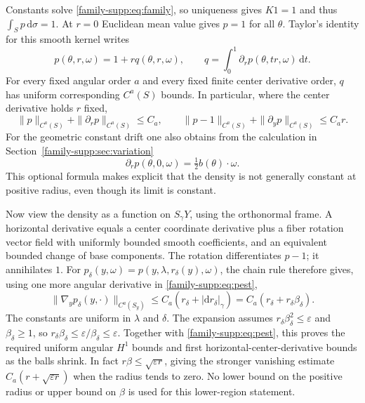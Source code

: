 \documentclass[11pt]{article}
\theoremstyle{definition}
\theoremstyle{remark}
\newcommand{\dd}{\mathrm d}
\numberwithin{equation}{section}
\providecommand{\la}{\lambda}
\providecommand{\tht}{\theta}
\begin{document}
Constants solve \eqref{family-supp:eq:family}, so uniqueness gives $K1=1$ and thus
$\int_Sp\,\dd\sigma=1$. At $r=0$ Euclidean mean value gives $p=1$
for all $\tht$. Taylor's identity for this smooth kernel writes
\begin{equation}\label{family-supp:eq:pdifference}
 p(\tht,r,\omega)=1+r q(\tht,r,\omega),\qquad
 q=\int_0^1\partial_r p(\tht,tr,\omega)\,\dd t.
\end{equation}
For every fixed angular order $a$ and every fixed finite center derivative
order, $q$ has uniform corresponding $C^a(S)$ bounds. In particular,
where the center derivative holds $r$ fixed,
\begin{equation}\label{family-supp:eq:pest}
 \|p\|_{C^a(S)}+\|\partial_rp\|_{C^a(S)}\leq C_a,\qquad
 \|p-1\|_{C^a(S)}+\|\partial_y p\|_{C^a(S)}\leq C_a r.
\end{equation}
For the geometric constant drift one also obtains from the calculation
in Section~\ref{family-supp:sec:variation}
\[
 \partial_rp(\tht,0,\omega)=\tfrac12 b(\tht)\cdot\omega.
\]
This optional formula makes explicit that the density is not generally
constant at positive radius, even though its limit is constant.

Now view the density as a function on $S_\gamma Y$, using the orthonormal
frame. A horizontal derivative equals a center coordinate derivative
plus a fiber rotation vector field with uniformly bounded smooth
coefficients, and an equivalent bounded change of base components.
The rotation differentiates $p-1$; it annihilates $1$. For
$p_\delta(y,\omega)=p(y,\la,r_\delta(y),\omega)$, the chain rule therefore
gives, using one more angular derivative in \eqref{family-supp:eq:pest},
\begin{equation}\label{family-supp:eq:movingp}
 \|\nabla_y p_\delta(y,\cdot)\|_{C^a(S_y)}
      \leq C_a(r_\delta+|\dd r_\delta|_\gamma)
      =C_a(r_\delta+r_\delta\beta_\delta).
\end{equation}
The constants are uniform in $\la$ and $\delta$. The expansion assumes
$r_\delta\beta_\delta^2\leq\varepsilon$ and $\beta_\delta\geq1$, so
$r_\delta\beta_\delta\leq\varepsilon/\beta_\delta\leq\varepsilon$.
Together with \eqref{family-supp:eq:pest}, this proves the required uniform angular
$H^1$ bounds and first horizontal-center-derivative bounds as the balls
shrink. In fact $r\beta\leq\sqrt{\varepsilon r}$, giving the stronger
vanishing estimate $C_a(r+\sqrt{\varepsilon r})$ when the radius tends
to zero. No lower bound on the positive radius or upper bound on $\beta$
is used for this lower-region statement.
\end{document}
